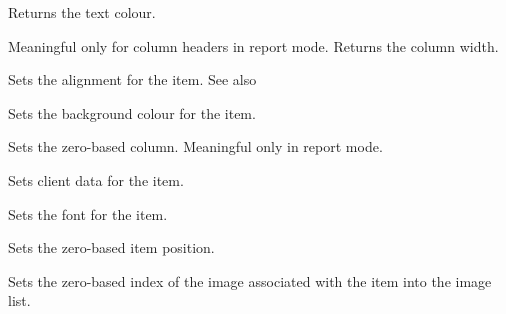 
Returns the text colour.

\label{wxlistitemgetwidth}


Meaningful only for column headers in report mode. Returns the column width.

\label{wxlistitemsetalign}


Sets the alignment for the item. See also

\label{wxlistitemsetbackgroundcolour}


Sets the background colour for the item.

\label{wxlistitemsetcolumn}


Sets the zero-based column. Meaningful only in report mode.

\label{wxlistitemsetdata}



Sets client data for the item.

\label{wxlistitemsetfont}


Sets the font for the item.

\label{wxlistitemsetid}


Sets the zero-based item position.

\label{wxlistitemsetimage}


Sets the zero-based index of the image associated with the item
into the image list.

\label{wxlistitemsetmask}

